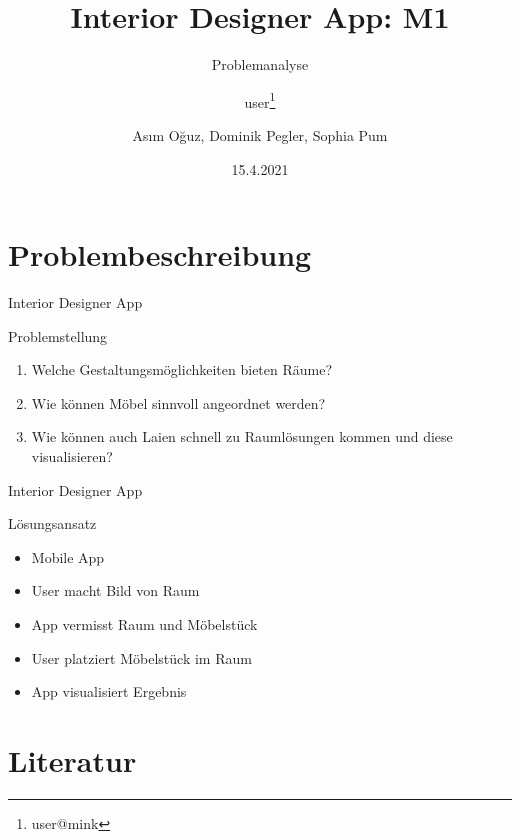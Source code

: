 \documentclass[presentation,bigger,aspectratio=169]{beamer}
\author{user\thanks{user@mink}}
\date{15.4.2021}
\title{Interior Designer App: M1}
\subtitle{Problemanalyse}
\author[A.Oğuz, D.Pegler, S.Pum]{Asım Oğuz, Dominik Pegler, Sophia Pum}
\institute{Universität Wien, Fakultät für Informatik (SS2021)}
\begin{document}
\maketitle

\section{Problembeschreibung}
\label{sec:org4cfab4a}
\begin{frame}[label={sec:org81d1ff0}]{\vspace{2.2cm}\begin{center}\MakeUppercase{\insertsection}\end{center}}
\end{frame}

\begin{frame}[label={sec:orgde08176}]{Interior Designer App}
\begin{block}{Problemstellung}
\begin{enumerate}
\item Welche Gestaltungsmöglichkeiten bieten Räume?
\item Wie können Möbel sinnvoll angeordnet werden?
\item Wie können auch Laien schnell zu Raumlösungen kommen und diese
visualisieren?
\end{enumerate}
\end{block}
\end{frame}
\begin{frame}[label={sec:org25577f7}]{Interior Designer App}
\begin{block}{Lösungsansatz}
\begin{itemize}
\item Mobile App
\item User macht Bild von Raum
\item App vermisst Raum und Möbelstück
\item User platziert Möbelstück im Raum
\item App visualisiert Ergebnis
\end{itemize}
\end{block}
\end{frame}

\section{Literatur}
\label{sec:orgb9dc101}
\begin{frame}[label={sec:orgac5e88b}]{\vspace{2.2cm}\begin{center}\MakeUppercase{\insertsection}\end{center}}
\end{frame}
\end{document}
